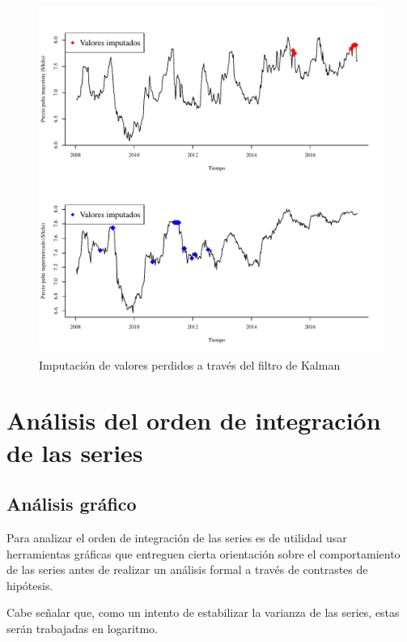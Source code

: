 \documentclass[12pt, twoside]{book}\usepackage[]{graphicx}\usepackage[]{color}
\newenvironment{knitrout}{}{} %
\numberwithin{equation}{section}
\numberwithin{theorem}{section}
\numberwithin{teorema}{section}
\numberwithin{defi}{section}
\numberwithin{prop}{section}
\numberwithin{defi}{section}
\theoremstyle{plain}
\begin{document}
\begin{knitrout}
\color{fgcolor}\begin{figure}[H]

{\centering \includegraphics[width=6.5in,height=4.5in]{figure/fig-2-1} 

}

\caption[Imputación de valores perdidos a través del filtro de Kalman]{Imputación de valores perdidos a través del filtro de Kalman}\label{fig:fig-2}
\end{figure}


\end{knitrout}

\section{Análisis del orden de integración de las series}
\subsection{Análisis gráfico}

Para analizar el orden de integración de las series es de utilidad usar herramientas gráficas que entreguen cierta orientación sobre el comportamiento de las series antes de realizar un análisis formal a través de contrastes de hipótesis. 

Cabe señalar que, como un intento de estabilizar la varianza de las series, estas serán trabajadas en logaritmo.
\end{document}
